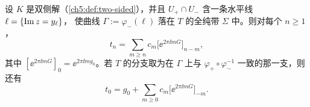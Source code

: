 \begin{theorem}[焊接恒等式]\label{thm:welding}
设 $K$ 是双侧解（\cref{ch5:def:two-sided}），并且 $U_+\cap U_-$ 含一条水平线 $\ell=\{\operatorname{Im} z=y_\ell\}$，
使曲线 $\Gamma:=\varphi_-(\ell)$ 落在 $T$ 的全纯带 $\Sigma$ 中。则对每个 $n\ge1$，
\begin{equation}\label{ch5:eq:welding}
 t_n=\sum_{m\ge n}c_m\bigl[\ee^{2\pi\ii mG}\bigr]_{n-m},
\end{equation}
其中 $[\ee^{2\pi\ii mG}]_0=\ee^{2\pi\ii mg_0}$。若 $T$ 的分支取为在 $\Gamma$ 上与 $\varphi_+\circ\varphi_-^{-1}$ 一致的那一支，则还有
\begin{equation}\label{ch5:eq:welding0}
 t_0=g_0+\sum_{m\ge0}c_m\bigl[\ee^{2\pi\ii mG}\bigr]_{-m}.
\end{equation}
\end{theorem}

